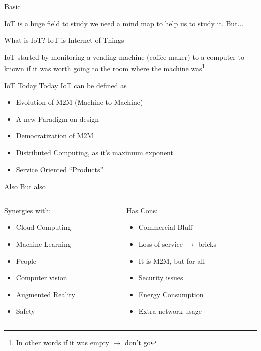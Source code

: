 

\begin{frame}{Basic}

	IoT is a huge field to study we need a mind map to help us to study it. But...
	\begin{alertblock}{What is IoT?}
		IoT is Internet of Things
	\end{alertblock}
	IoT started by monitoring a vending machine (coffee maker) to a computer to known if it was worth going to the room where the machine was\footnote{In other words if it was empty $\rightarrow$ don't go}.
\end{frame}

\begin{frame}{IoT Today}
	Today IoT can be defined as
	\begin{itemize}
		\item Evolution of M2M (Machine to Machine)
		\item A new Paradigm on design
		\item Democratization of M2M
		\item Distributed Computing, as it's maximum exponent
		\item Service Oriented ``Products''
	\end{itemize}
\end{frame}
\begin{frame}{Also}
	But also
	\begin{columns}
		\begin{column}{0.45\textwidth}
			\begin{block}{Synergies with:}
				\begin{itemize}
					\item Cloud Computing
					\item Machine Learning
					\item People
					\item Computer vision
					\item Augmented Reality
					\item Safety
				\end{itemize}
			\end{block}
		\end{column}
		\begin{column}{0.45\textwidth}
			\begin{block}{Has Cons:}
				\begin{itemize}
					\item Commercial Bluff
					\item Loss of service $\rightarrow$ bricks
					\item It is M2M, but for all
					\item Security issues
					\item Energy Consumption
					\item Extra network usage
				\end{itemize}
			\end{block}
		\end{column}
	\end{columns}
\end{frame}
